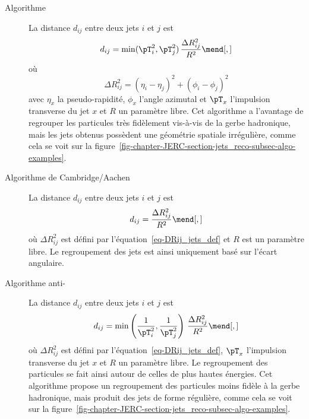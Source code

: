 \begin{description}
\item[Algorithme \kT~\cite{Catani_kT_algo}] La distance $d_{ij}$ entre deux jets $i$ et $j$ est
\begin{equation}
d_{ij} = \min({\pT}_i^2, {\pT}_j^2) \, \frac{\Delta R_{ij}^2}{R^2}
\mend[,]
\end{equation}
où
\begin{equation}
\Delta R_{ij}^2 = (\eta_i-\eta_j)^2 + (\phi_i-\phi_j)^2
\label{eq-DRij_jets_def}
\end{equation}
avec $\eta_x$ la pseudo-rapidité,
$\phi_x$ l'angle azimutal et
${\pT}_x$ l'impulsion transverse du jet $x$ et
$R$ un paramètre libre.
Cet algorithme a l'avantage de regrouper les particules très fidèlement vis-à-vis de la gerbe hadronique, mais les jets obtenus possèdent une géométrie spatiale irrégulière, comme cela se voit sur la figure~\ref{fig-chapter-JERC-section-jets_reco-subsec-algo-examples}.
\item[Algorithme de Cambridge/Aachen~\cite{Dokshitzer_1997,wobisch1999hadronization}] La distance $d_{ij}$ entre deux jets $i$ et $j$ est
\begin{equation}
d_{ij} = \frac{\Delta R_{ij}^2}{R^2}
\mend[,]
\end{equation}
où $\Delta R_{ij}^2$ est défini par l'équation~\eqref{eq-DRij_jets_def}
et $R$ est un paramètre libre. Le regroupement des jets est ainsi uniquement basé sur l'écart angulaire.
\item[Algorithme anti-\kT~\cite{Cacciari_antikT}] La distance $d_{ij}$ entre deux jets $i$ et $j$ est
\begin{equation}
d_{ij} = \min\left(\frac{1}{{\pT}_i^2}, \frac{1}{{\pT}_j^2}\right) \, \frac{\Delta R_{ij}^2}{R^2}
\mend[,]
\end{equation}
où $\Delta R_{ij}^2$ est défini par l'équation~\eqref{eq-DRij_jets_def},
${\pT}_x$ l'impulsion transverse du jet $x$ et $R$ un paramètre libre.
Le regroupement des particules se fait ainsi autour de celles de plus hautes énergies.
Cet algorithme propose un regroupement des particules moins fidèle à la gerbe hadronique, mais produit des jets de forme régulière, comme cela se voit sur la figure~\ref{fig-chapter-JERC-section-jets_reco-subsec-algo-examples}.
\end{description}
